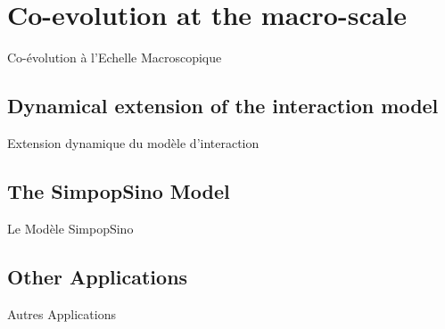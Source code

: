 
\chapter{Co-evolution at the macro-scale}{Co-évolution à l'Echelle Macroscopique}

\label{ch:macrocoevolution} 











\section[Interaction model][Modèle d'interaction]{Dynamical extension of the interaction model}{Extension dynamique du modèle d'interaction}


























\section[The SimpopSino Model][Le Modèle SimpopSino]{The SimpopSino Model}{Le Modèle SimpopSino}




















\section[Other Applications][Autres Applications]{Other Applications}{Autres Applications}




